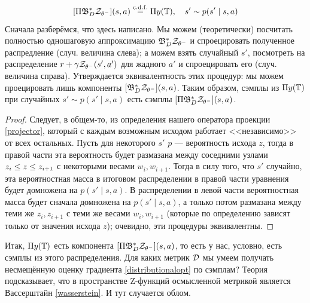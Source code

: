 \begin{theorem}
\begin{equation}\label{projectioncomponents}
[\Pi \mathfrak{B}^*_D \mathcal{Z}_{\theta^-}](s, a) \mathrel{\stackrel{\mathrm{c.d.f.}}=} \Pi y(\mathbb{T}), \quad s' \sim p(s' \mid s, a)
\end{equation}
\beginproof[Пояснение]
Сначала разберёмся, что здесь написано. Мы можем (теоретически) посчитать полностью одношаговую аппроксимацию $\mathfrak{B}^*_D \mathcal{Z}_{\theta^-}$ и спроецировать полученное распредление (случ. величина слева); а можем взять случайный $s'$, посмотреть на распределение $r + \gamma\mathcal{Z}_{\theta^-}(s', a')$ для жадного $a'$ и спроецировать его (случ. величина справа). Утверждается эквивалентность этих процедур: мы можем проецировать лишь компоненты $[\mathfrak{B}^*_D \mathcal{Z}_{\theta^-}](s, a)$. Таким образом, сэмплы из $\Pi y(\mathbb{T})$ при случайных $s' \sim p(s' \mid s, a)$ есть сэмплы $[\Pi \mathfrak{B}^*_D \mathcal{Z}_{\theta^-}](s, a)$.

\begin{proof} Следует, в общем-то, из определения нашего оператора проекции \eqref{projector}, который с каждым возможным исходом работает <<независимо>> от всех остальных. Пусть для некоторого $s'$ $p$ --- вероятность исхода $z$, тогда в правой части эта вероятность будет размазана между соседними узлами $z_i \HM\le z \HM\le z_{i+1}$ с некоторыми весами $w_i, w_{i+1}$. Тогда в силу того, что $s'$ случайно, эта вероятностная масса в итоговом распределении в правой части уравнения будет домножена на $p(s' \mid s, a)$. В распределении в левой части вероятностная масса будет сначала домножена на $p(s' \mid s, a)$, а только потом размазана между теми же $z_i, z_{i+1}$ с теми же весами $w_i, w_{i+1}$ (которые по определению зависят только от значения исхода $z$); очевидно, эти процедуры эквивалентны.
\end{proof}
\end{theorem}

Итак, $\Pi y(\mathbb{T})$ есть компонента $[\Pi \mathfrak{B}^*_D \mathcal{Z}_{\theta^-}](s, a)$, то есть у нас, условно, есть сэмплы из этого распределения. Для каких метрик $\mathcal{D}$ мы умеем получать несмещённую оценку градиента \eqref{distributionalopt} по сэмплам? Теория подсказывает, что в пространстве Z-функций осмысленной метрикой является Вассерштайн \eqref{wasserstein}. И тут случается облом.

